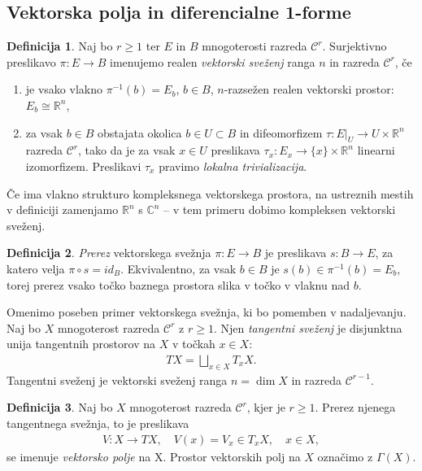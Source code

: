 \documentclass[12pt,a4paper,twoside]{article}
\theoremstyle{definition} %
\newtheorem{definicija}{Definicija}[section]
\theoremstyle{plain} %
\numberwithin{equation}{section}  %
\newcommand{\R}{\mathbb R}
\newcommand{\C}{\mathbb C}
\begin{document}
\subsection{Vektorska polja in diferencialne 1-forme}
%
\begin{definicija}
Naj bo $r \geq 1$ ter $E$ in $B$ mnogoterosti razreda $\mathcal{C}^{r}$.
Surjektivno preslikavo $\pi \colon E \to B$ imenujemo realen \emph{vektorski sveženj} ranga $n$ in razreda $\mathcal{C}^{r}$, če
\begin{enumerate}
\item je vsako vlakno $\pi^{-1}(b) = E_{b}$, $b \in B$, $n$-razsežen realen vektorski prostor: $E_{b} \cong \R^{n}$,
\item za vsak $b \in B$ obstajata okolica $b \in U \subset B$ in difeomorfizem $\tau \colon E|_{U} \to U \times \R^{n}$ razreda $\mathcal{C}^{r}$, tako da je za vsak $x \in U$ preslikava $ \tau_{x} \colon E_{x} \to \{x\} \times \R^{n} $ linearni izomorfizem. Preslikavi $\tau_{x}$ pravimo \emph{lokalna trivializacija}.
\end{enumerate}
Če ima vlakno strukturo kompleksnega vektorskega prostora, na ustreznih mestih v definiciji zamenjamo $\R^{n}$ s $\C^{n}$ -- v tem primeru dobimo kompleksen vektorski sveženj.
\end{definicija}

\begin{definicija}
\emph{Prerez} vektorskega svežnja $\pi \colon E \to B$ je preslikava $s \colon B \to E$, za katero velja $\pi \circ s = id_{B}$.
Ekvivalentno, za vsak $b \in B$ je $s(b) \in \pi^{-1}(b) = E_{b}$, torej prerez vsako točko baznega prostora slika v točko v vlaknu nad $b$.
\end{definicija}

Omenimo poseben primer vektorskega svežnja, ki bo pomemben v nadaljevanju. Naj bo $X$ mnogoterost razreda $\mathcal{C}^{r}$ z $r \geq 1$. Njen \emph{tangentni sveženj} je disjunktna unija tangentnih prostorov na $X$ v točkah $x \in X$:
\begin{gather}
TX = \bigsqcup_{x \in X} T_{x}X.
\end{gather}
Tangentni sveženj je vektorski sveženj ranga $n = \dim X$ in razreda $\mathcal{C}^{r-1}$.

\begin{definicija}
Naj bo $X$ mnogoterost razreda $\mathcal{C}^{r}$, kjer je $r \geq 1$. Prerez njenega tangentnega svežnja, to je preslikava 
\begin{align}
V \colon X \to TX, \quad V(x) = V_{x} \in T_{x}X, \quad x \in X,
\end{align}
se imenuje \emph{vektorsko polje} na X. Prostor vektorskih polj na $X$ označimo z $\Gamma (X)$.
\end{definicija}
\end{document}

